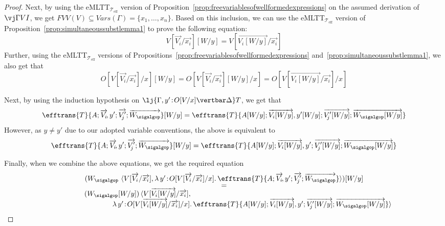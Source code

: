 \begin{proof}
Next, by using the eMLTT$_{\mathcal{T}_{\text{eff}}}$ version of Proposition~\ref{prop:freevariablesofwellformedexpressions} on the assumed derivation of $\vj \Gamma V I$, we get  $FVV(V) \subseteq V\!ars(\Gamma) = \{x_1, \ldots, x_n\}$. 
Based on this inclusion, we can use the eMLTT$_{\mathcal{T}_{\text{eff}}}$ version of Proposition~\ref{prop:simultaneoussubstlemma1} to prove the following equation:
\[
V[\overrightarrow{V_i}/\overrightarrow{x_i}][W/y] = V[\overrightarrow{V_i[W/y]}/\overrightarrow{x_i}]
\]
Further, using the eMLTT$_{\mathcal{T}_{\text{eff}}}$ versions of Propositions~\ref{prop:freevariablesofwellformedexpressions} and~\ref{prop:simultaneoussubstlemma1}, we also get that
\[
O[V[\overrightarrow{V_i}/\overrightarrow{x_i}]/x][W/y] = O[V[\overrightarrow{V_i}/\overrightarrow{x_i}][W/y]/x] = O[V[\overrightarrow{V_i[W/y]}/\overrightarrow{x_i}]/x]
\]

Next, by using the induction hypothesis on $\lj {\Gamma, y' \!:\! O[V/x] \vertbar \Delta} T$, we get that 
\[
\efftrans {T} {A; \overrightarrow{V_i}\!, y'; \overrightarrow{V'_{\!j}}; \overrightarrow{W_{\sigalgop}}}[W/y] = \efftrans {T} {A[W/y]; \overrightarrow{V_i[W/y]}, y'[W/y]; \overrightarrow{V'_{\!j}[W/y]}; \overrightarrow{W_{\sigalgop}[W/y]}}
\]
However, as $y \neq y'$ due to our adopted variable conventions, the above is equivalent to  
\[
\efftrans {T} {A; \overrightarrow{V_i}\!, y'; \overrightarrow{V'_{\!j}}; \overrightarrow{W_{\sigalgop}}}[W/y] = \efftrans {T} {A[W/y]; \overrightarrow{V_i[W/y]}, y'; \overrightarrow{V'_{\!j}[W/y]}; \overrightarrow{W_{\sigalgop}[W/y]}}
\]

Finally, when we combine the above equations, we get the required equation
\[
\begin{array}{c}
(W_{\sigalgop}\,\, \langle V[\overrightarrow{V_i}/\overrightarrow{x_i}] , \lambda\, y' \!:\! O[V[\overrightarrow{V_i}/\overrightarrow{x_i}]/x] .\, \efftrans {T} {A; \overrightarrow{V_i}\!, y'; \overrightarrow{V'_{\!j}}; \overrightarrow{W_{\sigalgop}}}\rangle)[W/y] 
\\[-1mm]
=
\\[-1mm]
\hspace{-8.5cm}
(W_{\sigalgop}[W/y])\, \langle V[\overrightarrow{V_i[W/y]}/\overrightarrow{x_i}] , 
\\
\hspace{2.75cm}
\lambda\, y' \!:\! O[V[\overrightarrow{V_i[W/y]}/\overrightarrow{x_i}]/x] .\, \efftrans {T} {A[W/y]; \overrightarrow{V_i[W/y]}, y'; \overrightarrow{V'_{\!j}[W/y]}; \overrightarrow{W_{\sigalgop}[W/y]}}\rangle
\end{array}
\]
\end{proof}

